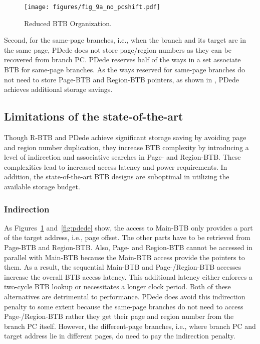 \begin{figure}
\centering
\texttt{[image: figures/fig\_9a\_no\_pcshift.pdf]}
\caption{Reduced BTB Organization.}
\label{fig:rbtb}
\end{figure}

Second, for the same-page branches, i.e., when the branch and its target are in the same page, PDede does not store page/region numbers as they can be recovered from branch PC. PDede reserves half of the ways in a set associate BTB for same-page branches. As the ways reserved for same-page branches do not need to store Page-BTB and Region-BTB pointers, as shown in , PDede achieves additional storage savings.

\subsection{Limitations of the state-of-the-art} Though R-BTB and PDede achieve significant storage saving by avoiding page and region number duplication, they increase BTB complexity by introducing a level of indirection and associative searches in Page- and Region-BTB. These complexities lead to increased access latency and power requirements. In addition, the state-of-the-art BTB designs are suboptimal in utilizing the available storage budget.


\subsubsection{Indirection} As Figures~\ref{fig:rbtb} and~\ref{fig:pdede} show, the access to Main-BTB only provides a part of the target address, i.e., page offset. The other parts have to be retrieved from Page-BTB and Region-BTB. Also, Page- and Region-BTB cannot be accessed in parallel with Main-BTB because the Main-BTB access provide the pointers to them. As a result, the sequential Main-BTB and Page-/Region-BTB accesses increase the overall BTB access latency. This additional latency either enforces a two-cycle BTB lookup or necessitates a longer clock period. Both of these alternatives are detrimental to performance.  PDede does avoid this indirection penalty to some extent because the same-page branches do not need to access Page-/Region-BTB rather they get their page and region number from the branch PC itself. However, the different-page branches, i.e., where branch PC and target address lie in different pages, do need to pay the indirection penalty.

